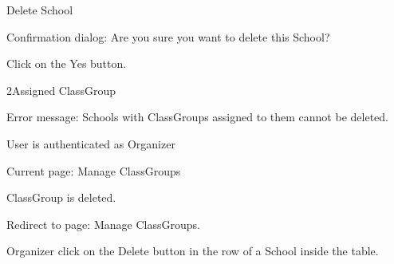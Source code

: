 
\begin{uc}{Delete School}


    \begin{uc-mss}
    \item Confirmation dialog: Are you sure you want to delete this School?
    \item Click on the Yes button.
    \end{uc-mss}

    \begin{uc-ext}
        
        \begin{uc-fail}{2}{Assigned ClassGroup}
        \item Error message: Schools with ClassGroups assigned to them cannot be deleted.
        \end{uc-fail}

    \end{uc-ext}

    \begin{uc-pre}
    \item User is authenticated as Organizer
    \item Current page: Manage ClassGroups
    \end{uc-pre}

    \begin{uc-post}
    \item ClassGroup is deleted.
    \item Redirect to page: Manage ClassGroups.
    \end{uc-post}

    \begin{uc-trig}
        Organizer click on the Delete button in the row of a School inside the table.
    \end{uc-trig}
\end{uc}

